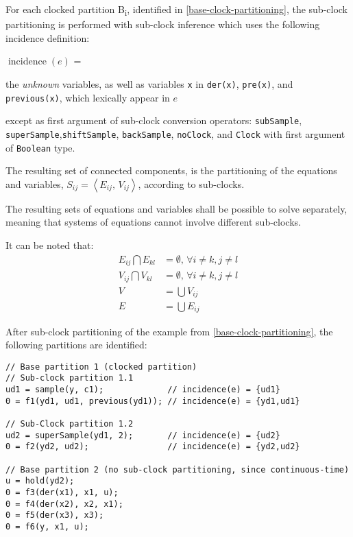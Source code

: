For each clocked partition B\textsubscript{i}, identified in
\cref{base-clock-partitioning}, the sub-clock partitioning is performed with sub-clock inference
which uses the following incidence definition:

$\operatorname{incidence}(e)$ =
\begin{list}{}{\setlength{\leftmargin}{2em}\setlength{\topsep}{-\parskip}}
\item
the \emph{unknown} variables, as well as variables \lstinline!x! in \lstinline!der(x)!, \lstinline!pre(x)!, and \lstinline!previous(x)!, which lexically appear in $e$
\begin{list}{}{\setlength{\leftmargin}{2em}\setlength{\topsep}{-\parskip}}
\item
except as first argument of sub-clock conversion operators: \lstinline!subSample!, \lstinline!superSample!,\linebreak[4] \lstinline!shiftSample!, \lstinline!backSample!, \lstinline!noClock!, and \lstinline!Clock! with first argument of \lstinline!Boolean! type.
\end{list}
\end{list}\vspace{\parskip}%

The resulting set of connected components, is the partitioning of the equations and variables, $S_{ij} = \left\langle E_{ij},\, V_{ij} \right\rangle$, according to sub-clocks.

The resulting sets of equations and variables shall be possible to solve separately, meaning that systems of equations cannot involve different sub-clocks.

It can be noted that:
\begin{equation*}
\begin{aligned}
E_{ij} \bigcap E_{kl} &= \emptyset,\, \forall i\ne{}k, j\ne{}l \\
V_{ij} \bigcap V_{kl} &= \emptyset,\, \forall i\ne{}k, j\ne{}l \\
V &= \bigcup V_{ij} \\
E &= \bigcup E_{ij}
\end{aligned}
\end{equation*}

\begin{example}
After sub-clock partitioning of the example from \cref{base-clock-partitioning}, the following partitions are identified:
\begin{lstlisting}[language=modelica]
// Base partition 1 (clocked partition)
// Sub-clock partition 1.1
ud1 = sample(y, c1);             // incidence(e) = {ud1}
0 = f1(yd1, ud1, previous(yd1)); // incidence(e) = {yd1,ud1}

// Sub-Clock partition 1.2
ud2 = superSample(yd1, 2);       // incidence(e) = {ud2}
0 = f2(yd2, ud2);                // incidence(e) = {yd2,ud2}

// Base partition 2 (no sub-clock partitioning, since continuous-time)
u = hold(yd2);
0 = f3(der(x1), x1, u);
0 = f4(der(x2), x2, x1);
0 = f5(der(x3), x3);
0 = f6(y, x1, u);
\end{lstlisting}
\end{example}

